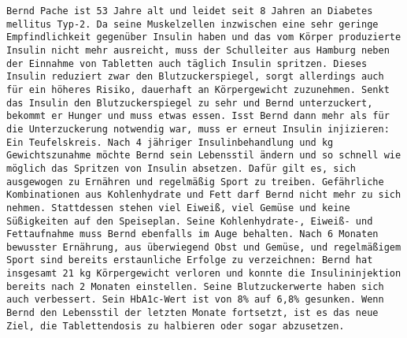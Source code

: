 	    \texttt{Bernd Pache ist 53 Jahre alt und leidet seit 8 Jahren an Diabetes \newline
	mellitus Typ-2. Da seine Muskelzellen inzwischen eine sehr geringe \newline
	Empfindlichkeit gegenüber Insulin haben und das vom Körper produzierte \newline
	Insulin nicht mehr ausreicht, muss der Schulleiter aus Hamburg neben \newline
	der Einnahme von Tabletten auch täglich Insulin spritzen. Dieses Insulin \newline
	reduziert zwar den Blutzuckerspiegel, sorgt allerdings auch für ein \newline
	höheres Risiko, dauerhaft an Körpergewicht zuzunehmen. Senkt das \newline
	Insulin den Blutzuckerspiegel zu sehr und Bernd unterzuckert, \newline
	bekommt er Hunger und muss etwas essen. Isst Bernd dann mehr \newline
	als für die Unterzuckerung notwendig war, muss er erneut Insulin \newline
	injizieren: Ein Teufelskreis. Nach 4 jähriger Insulinbehandlung und  kg Gewichtszunahme möchte Bernd sein Lebensstil ändern und \newline
	so schnell wie möglich das Spritzen von Insulin absetzen. Dafür gilt es, \newline
	sich ausgewogen zu Ernähren und regelmäßig Sport zu treiben. \newline
	Gefährliche Kombinationen aus Kohlenhydrate und Fett darf Bernd \newline
	nicht mehr zu sich nehmen. Stattdessen stehen viel Eiweiß, viel Gemüse \newline
	und keine Süßigkeiten auf den Speiseplan. Seine Kohlenhydrate-, \newline
	Eiweiß- und Fettaufnahme muss Bernd ebenfalls im Auge behalten.\newline
	Nach 6 Monaten bewusster Ernährung, aus überwiegend Obst und \newline
	Gemüse, und regelmäßigem Sport sind bereits erstaunliche Erfolge \newline
	zu verzeichnen: Bernd hat insgesamt 21 kg Körpergewicht verloren \newline
	und konnte die Insulininjektion bereits nach 2 Monaten einstellen. \newline
	Seine Blutzuckerwerte haben sich auch verbessert. Sein HbA1c-Wert \newline
	ist von 8\% auf 6,8\% gesunken. Wenn Bernd den Lebensstil der letzten  Monate fortsetzt, ist es das neue Ziel, die Tablettendosis zu halbieren \newline
	oder sogar abzusetzen.}
	
